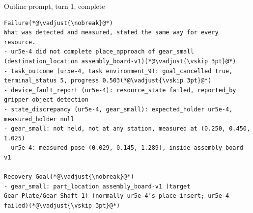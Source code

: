 \documentclass[preprint,12pt,authoryear]{elsarticle}
\begin{document}
\begin{fullbox}{Outline prompt, turn 1, complete}
\begin{lstlisting}[showlines=true]
Failure(*@\vadjust{\nobreak}@*)
What was detected and measured, stated the same way for every resource.
- ur5e-4 did not complete place_approach of gear_small (destination_location assembly_board-v1)(*@\vadjust{\vskip 3pt}@*)
- task_outcome (ur5e-4, task environment_9): goal_cancelled true, terminal_status 5, progress 0.503(*@\vadjust{\vskip 3pt}@*)
- device_fault_report (ur5e-4): resource_state failed, reported_by gripper object detection
- state_discrepancy (ur5e-4, gear_small): expected_holder ur5e-4, measured_holder null
- gear_small: not held, not at any station, measured at (0.250, 0.450, 1.025)
- ur5e-4: measured pose (0.029, 0.145, 1.289), inside assembly_board-v1

Recovery Goal(*@\vadjust{\nobreak}@*)
- gear_small: part_location assembly_board-v1 (target Gear_Plate/Gear_Shaft_1) (normally ur5e-4's place_insert; ur5e-4 failed)(*@\vadjust{\vskip 3pt}@*)


\end{lstlisting}
\end{fullbox}
\end{document}
